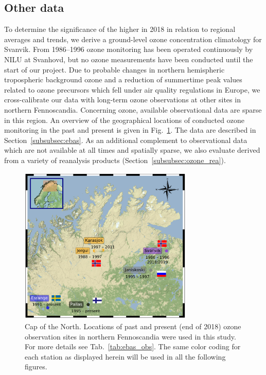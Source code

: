 \documentclass[bg, manuscript]{copernicus}
\begin{document}
\subsection{Other data}
\label{subsec:other_data}
To determine the significance of the higher \chem{[O_3]} in 2018 in relation to regional averages and trends, we derive a ground-level ozone concentration climatology for Svanvik. From 1986--1996 ozone monitoring has been operated continuously by NILU at Svanhovd, but no ozone measurements have been conducted until the start of our project. Due to probable changes in northern hemispheric tropospheric background ozone and a reduction of summertime peak values related to ozone precursors which fell under air quality regulations in Europe, we cross-calibrate our data with long-term ozone observations at other sites in northern Fennoscandia. Concerning ozone, available observational data are sparse in this region. An overview of the geographical locations of conducted ozone monitoring in the past and present is given in Fig.~\ref{fig:station_map_fennoscandia}. The data are described in Section~\ref{subsubsec:ebas}. 
As an additional complement to observational data which are not available at all times and spatially sparse, we also evaluate \chem{[O_3]} derived from a variety of reanalysis products (Section~\ref{subsubsec:ozone_rea}).

\begin{figure}[t]
  \includegraphics[width=8.3cm]{fig03}
  \caption{Cap of the North. Locations of past and present (end of 2018) ozone observation sites in northern Fennoscandia were used in this study. For more details see Tab.~\ref{tab:ebas_obs}. The same color coding for each station as displayed herein will be used in all the following figures.}
  \label{fig:station_map_fennoscandia}
\end{figure}
\end{document}
